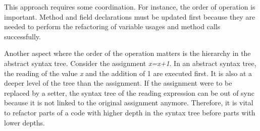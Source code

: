 This approach requires some coordination. For instance, the order of operation is important. Method and field declarations must be updated first because they are needed to perform the refactoring of variable usages and method calls successfully. 

Another aspect where the order of the operation matters is the hierarchy in the abstract syntax tree. Consider the assignment \textit{x=x+1}. In an abstract syntax tree, the reading of the value \textit{x} and the addition of 1 are executed first. It is also at a deeper level of the tree than the assignment. If the assignment were to be replaced by a setter, the syntax tree of the reading expression can be out of sync because it is not linked to the original assignment anymore. Therefore, it is vital to refactor parts of a code with higher depth in the syntax tree before parts with lower depths. 
